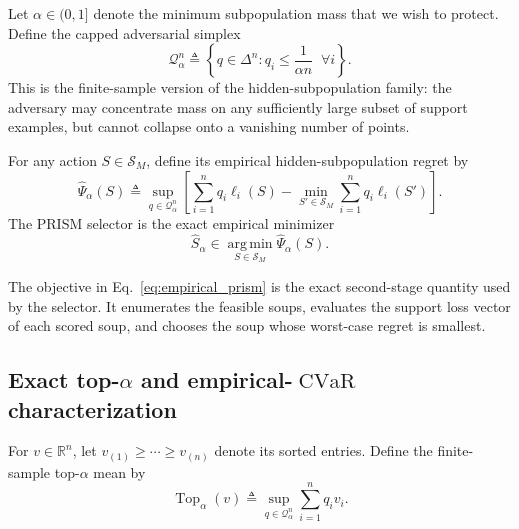\documentclass{article}
\newcommand{\RR}{\mathbb{R}}
\newcommand{\cQ}{\mathcal{Q}}
\newcommand{\cS}{\mathcal{S}}
\newcommand{\argmin}{\operatorname*{arg\,min}}
\newcommand{\CVaR}{\operatorname{CVaR}}
\newcommand{\Top}{\operatorname{Top}}
\newcommand{\simplex}{\Delta}
\newcommand{\prism}{\textup{\textsc{PRISM}}}
\newcommand{\braces}[1]{\left\{ #1 \right\}}
\newcommand{\loss}{\ell}
\newcommand{\1}{\mathbbm{1}}
\begin{document}
Let \(\alpha\in(0,1]\) denote the minimum subpopulation mass that we wish to protect. Define the capped adversarial simplex
\begin{equation}
    \cQ_\alpha^n
    \triangleq
    \braces{
        q \in \simplex^n :
        q_i \le \frac{1}{\alpha n}
        \;\;\forall i
    }.
    \label{eq:capped_simplex}
\end{equation}
This is the finite-sample version of the hidden-subpopulation family: the adversary may concentrate mass on any sufficiently large subset of support examples, but cannot collapse onto a vanishing number of points.

For any action \(S\in\cS_M\), define its empirical hidden-subpopulation regret by
\begin{equation}
    \widehat{\Psi}_\alpha(S)
    \triangleq
    \sup_{q \in \cQ_\alpha^n}
    \left[
        \sum_{i=1}^{n} q_i \loss_i(S)
        -
        \min_{S' \in \cS_M}
        \sum_{i=1}^{n} q_i \loss_i(S')
    \right].
    \label{eq:empirical_prism}
\end{equation}
The \prism{} selector is the exact empirical minimizer
\begin{equation}
    \widehat{S}_\alpha
    \in
    \argmin_{S\in\cS_M} \widehat{\Psi}_\alpha(S).
    \label{eq:prism_selector}
\end{equation}

The objective in Eq.~\eqref{eq:empirical_prism} is the exact second-stage quantity used by the selector. It enumerates the feasible soups, evaluates the support loss vector of each scored soup, and chooses the soup whose worst-case regret is smallest.

\subsection{\texorpdfstring{Exact top-\(\alpha\) and empirical-\(\CVaR\) characterization}{Exact top-alpha and empirical-CVaR characterization}}

For \(v\in\RR^n\), let \(v_{(1)}\ge \cdots \ge v_{(n)}\) denote its sorted entries. Define the finite-sample top-\(\alpha\) mean by
\begin{equation}
    \Top_\alpha(v)
    \triangleq
    \sup_{q\in\cQ_\alpha^n} \sum_{i=1}^{n} q_i v_i.
    \label{eq:top_alpha_def}
\end{equation}
\end{document}
